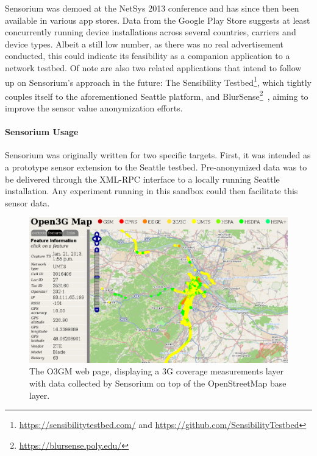 Sensorium was demoed at the NetSys 2013 conference and has since then been available in various app stores. Data from the Google Play Store suggests at least  concurrently running device installations across several countries, carriers and device types. Albeit a still low number, as there was no real advertisement conducted, this could indicate its feasibility as a companion application to a network testbed. Of note are also two related applications that intend to follow up on Sensorium's approach in the future: The Sensibility Testbed\footnote{\url{https://sensibilitytestbed.com/} and \url{https://github.com/SensibilityTestbed}}, which tightly couples itself to the aforementioned Seattle platform, and BlurSense\footnote{\url{https://blursense.poly.edu/}}~\cite{6798970}, aiming to improve the sensor value anonymization efforts. 


\paragraph{Sensorium Usage}

Sensorium was originally written for two specific targets. First, it was intended as a prototype sensor extension to the Seattle testbed. Pre-anonymized data was to be delivered through the \acrshort{XML}-\acrshort{RPC} interface to a locally running Seattle installation. Any experiment running in this sandbox could then facilitate this sensor data.

\begin{figure}[htb]
	\centering
	\includegraphics[width=\textwidth]{images/o3gm.png}
	\caption{The \acrshort{O3GM} web page, displaying a \acrshort{3G} coverage measurements layer with data collected by Sensorium on top of the OpenStreetMap base layer.}
\label{c5:fig:ogggm}
\end{figure}

